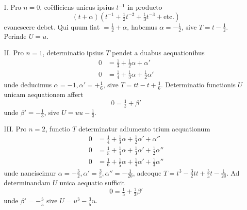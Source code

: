 I. Pro $n=0$, coëfficiens unicus ipsius $t^{-1}$ in producto
\[
(t+\alpha)(t^{-1}+\tfrac12t^{-2}+\tfrac13t^{-3}+\text{etc.})
\]
evanescere debet. Qui quum fiat $=\frac12+\alpha$, habemus $\alpha=-\frac12$, sive $T=t-\frac12$.
Perinde $U=u$.

II. Pro $n=1$, determinatio ipsius $T$ pendet a duabus aequationibus
\[
\begin{aligned}
0&=\tfrac13+\tfrac12\alpha+\alpha'\\
0&=\tfrac14+\tfrac13\alpha+\tfrac12\alpha'
\end{aligned}
\]
unde deducimus $\alpha=-1,\alpha'=+\frac16$, sive $T=tt-t+\frac16$. Determinatio functionis $U$ unicam aequationem affert
\[
0=\tfrac13+\beta'
\]
unde $\beta'=-\frac13$, sive $U=uu-\frac13$.

III. Pro $n=2$, functio $T$ determinatur adiumento trium aequationum
\[
\begin{aligned}
0&=\tfrac14+\tfrac13\alpha+\tfrac12\alpha'+\alpha''\\
0&=\tfrac15+\tfrac14\alpha+\tfrac13\alpha'+\tfrac12\alpha''\\
0&=\tfrac16+\tfrac15\alpha+\tfrac14\alpha'+\tfrac13\alpha''
\end{aligned}
\]
unde nanciscimur $\alpha=-\frac32,\alpha'=\frac35,\alpha''=-\frac1{20}$, adeoque $T=t^3-\frac32tt+\frac35t-\frac1{20}$.
Ad determinandam $U$ unica aequatio sufficit
\[
0=\tfrac15+\tfrac13\beta'
\]
unde $\beta'=-\frac35$ sive $U=u^3-\frac35u$.

